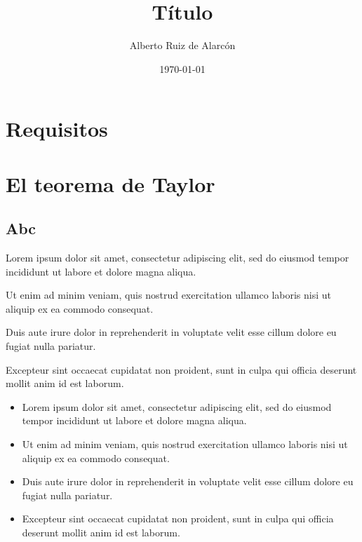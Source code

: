 \documentclass[12pt, a4paper, oneside]{amsart}
\title{Título}
\author{Alberto Ruiz de Alarcón}
\date{\today}
\begin{document}
\maketitle
\tableofcontents


\section*{Requisitos}


\section{El teorema de Taylor}


\subsection{Abc}

Lorem ipsum dolor sit amet, consectetur adipiscing elit, sed do eiusmod tempor incididunt ut labore et dolore magna aliqua.

Ut enim ad minim veniam, quis nostrud exercitation ullamco laboris nisi ut aliquip ex ea commodo consequat.

Duis aute irure dolor in reprehenderit in voluptate velit esse cillum dolore eu fugiat nulla pariatur.

Excepteur sint occaecat cupidatat non proident, sunt in culpa qui officia deserunt mollit anim id est laborum.

\begin{itemize}
\item Lorem ipsum dolor sit amet, consectetur adipiscing elit, sed do eiusmod tempor incididunt ut labore et dolore magna aliqua.
\item Ut enim ad minim veniam, quis nostrud exercitation ullamco laboris nisi ut aliquip ex ea commodo consequat.

\item Duis aute irure dolor in reprehenderit in voluptate velit esse cillum dolore eu fugiat nulla pariatur.

\item Excepteur sint occaecat cupidatat non proident, sunt in culpa qui officia deserunt mollit anim id est laborum.
\end{itemize}
\end{document}
